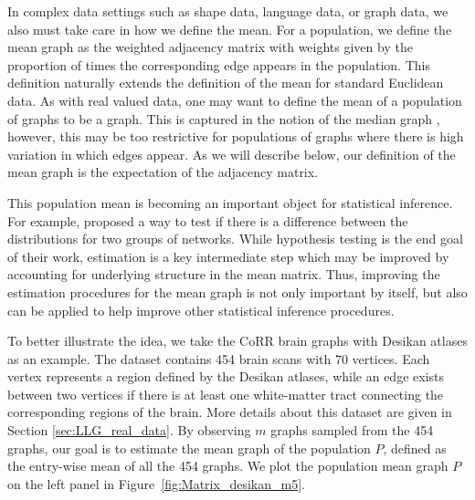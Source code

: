 In complex data settings such as shape data, language data, or graph data, we also must take care in how we define the mean.
For a population, we define the mean graph as the weighted adjacency matrix with weights given by the proportion of times the corresponding edge appears in the population. 
This definition naturally extends the definition of the mean for standard Euclidean data.
As with real valued data, one may want to define the mean of a population of graphs to be a graph.
This is captured in the notion of the median graph \citep{jiang2001median}, however, this may be too restrictive for populations of graphs where there is high variation in which edges appear. 
As we will describe below, our definition of the mean graph is the expectation of the adjacency matrix.

This population mean is becoming an important object for statistical inference.
For example, \citet{ginestet2014hypothesis} proposed a way to test if there is a difference between the distributions for two groups of networks.  
While hypothesis testing is the end goal of their work, estimation is a key intermediate step which may be improved by accounting for underlying structure in the mean matrix. 
Thus, improving the estimation procedures for the mean graph is not only important by itself, but also can be applied to help improve other statistical inference procedures.

To better illustrate the idea, we take the CoRR brain graphs with Desikan atlases as an example. The dataset contains 454 brain scans with 70 vertices. Each vertex represents a region defined by the Desikan atlases, while an edge exists between two vertices if there is at least one white-matter tract connecting the corresponding regions of the brain. More details about this dataset are given in Section \ref{sec:LLG_real_data}. By observing $m$ graphs sampled from the 454 graphs, our goal is to estimate the mean graph of the population $P$, defined as the entry-wise mean of all the 454 graphs. We plot the population mean graph $P$ on the left panel in Figure~\ref{fig:Matrix_desikan_m5}.


